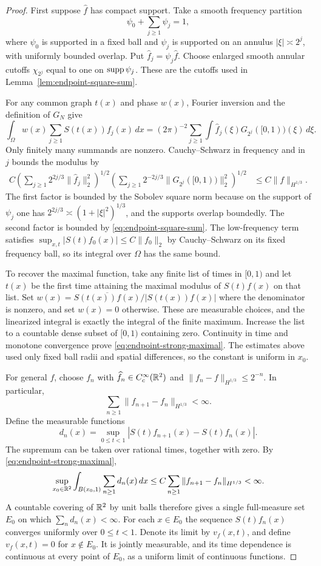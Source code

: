 \begin{proof}
First suppose $\widehat f$ has compact support.  Take a smooth frequency
partition
\[
 \psi_0+\sum_{j\ge1}\psi_j=1,
\]
where $\psi_0$ is supported in a fixed ball and $\psi_j$ is supported on
an annulus $|\xi|\asymp2^j$, with uniformly bounded overlap.  Put
$\widehat f_j=\psi_j\widehat f$.  Choose enlarged smooth annular cutoffs
$\chi_{2^j}$ equal to one on $\operatorname{supp}\psi_j$.  These are the cutoffs used in
Lemma~\ref{lem:endpoint-square-sum}.

For any common graph $t(x)$ and phase $w(x)$, Fourier inversion and the
definition of $G_N$ give
\[
 \int_\Omega w(x)\sum_{j\ge1}S(t(x))f_j(x)\,dx
       =(2\pi)^{-2}\sum_{j\ge1}
             \int\widehat f_j(\xi)G_{2^j}([0,1))(\xi)\,d\xi.
\]
Only finitely many summands are nonzero.  Cauchy--Schwarz in frequency
and in $j$ bounds the modulus by
\begin{align}
 C\left(\sum_{j\ge1}2^{2j/3}\|\widehat f_j\|_2^2\right)^{1/2}
  \left(\sum_{j\ge1}2^{-2j/3}
              \|G_{2^j}([0,1))\|_2^2\right)^{1/2}
 &\le C\|f\|_{H^{1/3}}.
 \label{eq:endpoint-frequency-cauchy-schwarz}
\end{align}
The first factor is bounded by the Sobolev square norm because on the
support of $\psi_j$ one has
$2^{2j/3}\asymp(1+|\xi|^2)^{1/3}$, and the supports overlap boundedly.
The second factor is bounded by \eqref{eq:endpoint-square-sum}.
The low-frequency term satisfies
$\sup_{x,t}|S(t)f_0(x)|\le C\|f_0\|_2$ by Cauchy--Schwarz on its fixed
frequency ball, so its integral over $\Omega$ has the same bound.

To recover the maximal function, take any finite list of times in
$[0,1)$ and let $t(x)$ be the first time attaining the maximal modulus
of $S(t)f(x)$ on that list.  Set
$w(x)=\overline{S(t(x))f(x)}/|S(t(x))f(x)|$ where the denominator is
nonzero, and set $w(x)=0$ otherwise.  These are measurable choices, and
the linearized integral is exactly the integral of the finite maximum.
Increase the list to a countable dense subset of $[0,1)$ containing zero.
Continuity in time and monotone convergence prove
\eqref{eq:endpoint-strong-maximal}.  The estimates above used only fixed
ball radii and spatial differences, so the constant is uniform in $x_0$.

For general $f$, choose $f_n$ with $\widehat f_n\in C_c^\infty(\mathbb R^2)$
and $\|f_n-f\|_{H^{1/3}}\le2^{-n}$.  In particular,
\[
 \sum_{n\ge1}\|f_{n+1}-f_n\|_{H^{1/3}}<\infty.
\]
Define the measurable functions
\[
 d_n(x)=\sup_{0\le t<1}
              |S(t)f_{n+1}(x)-S(t)f_n(x)|.
\]
The supremum can be taken over rational times, together with zero.
By \eqref{eq:endpoint-strong-maximal},
\[
 \sup_{x_0\in\mathbb R^2}\int_{B(x_0,1)}\sum_{n\ge1}d_n(x)\,dx
 \le C\sum_{n\ge1}\|f_{n+1}-f_n\|_{H^{1/3}}<\infty.
\]
A countable covering of $\mathbb R^2$ by unit balls therefore gives a single
full-measure set $E_0$ on which $\sum_n d_n(x)<\infty$.  For each
$x\in E_0$ the sequence $S(t)f_n(x)$ converges uniformly over
$0\le t<1$.  Denote its limit by $v_f(x,t)$, and define $v_f(x,t)=0$ for
$x\notin E_0$.  It is jointly measurable, and its time dependence is
continuous at every point of $E_0$, as a uniform limit of continuous
functions.


\end{proof}
